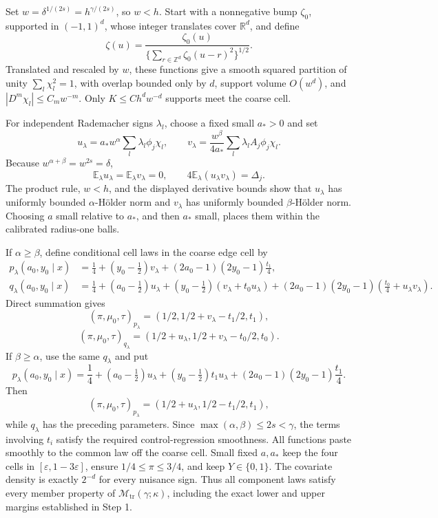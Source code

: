 Set \(w=\delta^{1/(2s)}=h^{\gamma/(2s)}\), so \(w<h\). Start with a nonnegative bump \(\zeta_0\), supported in \((-1,1)^d\), whose integer translates cover \(\mathbb R^d\), and define
\[
\zeta(u)=\frac{\zeta_0(u)}{\{\sum_{r\in\mathbb Z^d}\zeta_0(u-r)^2\}^{1/2}}.
\]
Translated and rescaled by \(w\), these functions give a smooth squared partition of unity \(\sum_l\chi_l^2=1\), with overlap bounded only by \(d\), support volume \(O(w^d)\), and \(|D^m\chi_l|\le C_mw^{-m}\). Only \(K\le Ch^dw^{-d}\) supports meet the coarse cell.

For independent Rademacher signs \(\lambda_l\), choose a fixed small \(a_*>0\) and set
\[
u_\lambda=a_*w^\alpha\sum_l\lambda_l\phi_j\chi_l,
\qquad
v_\lambda=\frac{w^\beta}{4a_*}\sum_l\lambda_lA_j\phi_j\chi_l.
\]
Because \(w^{\alpha+\beta}=w^{2s}=\delta\),
\[
\mathbb E_\lambda u_\lambda=\mathbb E_\lambda v_\lambda=0,
\qquad
4\mathbb E_\lambda(u_\lambda v_\lambda)=\Delta_j.
\]
The product rule, \(w<h\), and the displayed derivative bounds show that \(u_\lambda\) has uniformly bounded \(\alpha\)-Hölder norm and \(v_\lambda\) has uniformly bounded \(\beta\)-Hölder norm. Choosing \(a\) small relative to \(a_*\), and then \(a_*\) small, places them within the calibrated radius-one balls.

If \(\alpha\ge\beta\), define conditional cell laws in the coarse edge cell by
\[
\begin{aligned}
p_\lambda(a_0,y_0\mid x)
&=\frac14+(y_0-\tfrac12)v_\lambda+(2a_0-1)(2y_0-1)\frac{t_1}{4},\\
q_\lambda(a_0,y_0\mid x)
&=\frac14+(a_0-\tfrac12)u_\lambda+(y_0-\tfrac12)(v_\lambda+t_0u_\lambda)
 +(2a_0-1)(2y_0-1)\left(\frac{t_0}{4}+u_\lambda v_\lambda\right).
\end{aligned}
\]
Direct summation gives
\[
(\pi,\mu_0,\tau)_{p_\lambda}
=(1/2,1/2+v_\lambda-t_1/2,t_1),
\]
\[
(\pi,\mu_0,\tau)_{q_\lambda}
=(1/2+u_\lambda,1/2+v_\lambda-t_0/2,t_0).
\]
If \(\beta\ge\alpha\), use the same \(q_\lambda\) and put
\[
p_\lambda(a_0,y_0\mid x)=\frac14+(a_0-\tfrac12)u_\lambda+(y_0-\tfrac12)t_1u_\lambda+(2a_0-1)(2y_0-1)\frac{t_1}{4}.
\]
Then
\[
(\pi,\mu_0,\tau)_{p_\lambda}
=(1/2+u_\lambda,1/2-t_1/2,t_1),
\]
while \(q_\lambda\) has the preceding parameters. Since \(\max(\alpha,\beta)\le2s<\gamma\), the terms involving \(t_i\) satisfy the required control-regression smoothness. All functions paste smoothly to the common law off the coarse cell. Small fixed \(a,a_*\) keep the four cells in \([\varepsilon,1-3\varepsilon]\), ensure \(1/4\le\pi\le3/4\), and keep \(Y\in\{0,1\}\). The covariate density is exactly \(2^{-d}\) for every nuisance sign. Thus all component laws satisfy every member property of \(\mathcal M_{\mathrm{tr}}(\gamma;\kappa)\), including the exact lower and upper margins established in Step 1.

